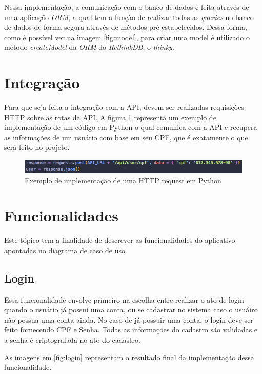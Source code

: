 Nessa implementação, a comunicação com o banco de dados é feita através de uma aplicação \textit{ORM}, a qual tem a função de realizar todas as \textit{queries} no banco de dados de forma segura através de métodos pré estabelecidos. Dessa forma, como é possível ver na imagem \ref{fig:model}, para criar uma model é utilizado o método \textit{createModel} da \textit{ORM} do \textit{RethinkDB}, o \textit{thinky}.

\section{Integração}

Para que seja feita a integração com a API, devem ser realizadas requisições HTTP sobre as rotas da API. A figura \ref{fig:python} representa um exemplo de implementação de um código em Python o qual comunica com a API e recupera as informações de um usuário com base em seu CPF, que é exatamente o que será feito no projeto.

\begin{figure}[!ht]
	\centering
		\includegraphics[scale=0.7]{figuras/software/python.png}
	\caption{Exemplo de implementação de uma HTTP request em Python}
	\label{fig:python}
\end{figure}

\section{Funcionalidades}

Este tópico tem a finalidade de descrever as funcionalidades do aplicativo apontadas no diagrama de caso de uso.

\subsection{Login}

Essa funcionalidade envolve primeiro na escolha entre realizar o ato de login quando o usuário já possui uma conta, ou se cadastrar no sistema caso o usuáiro não possua uma conta ainda. No caso de já possuir uma conta, o login deve ser feito fornecendo CPF e Senha. Todas as informações do cadastro são validadas e a senha é criptografada no ato do cadastro.

As imagens em \ref{fig:login} representam o resultado final da implementação dessa funcionalidade.

